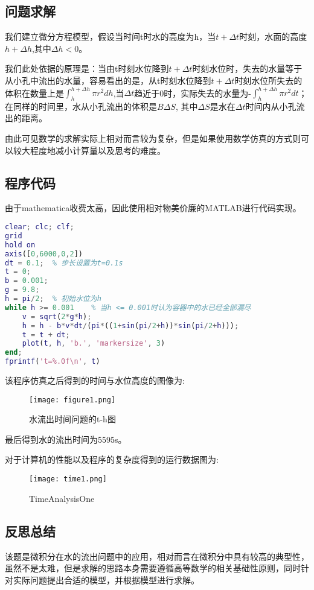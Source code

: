 \documentclass[UTF8]{ctexart}
\begin{document}
    \subsection{问题求解}
    我们建立微分方程模型，假设当时间t时水的高度为h，当$t+\Delta{t}$时刻，水面的高度$h+\Delta{h}$,其中$\Delta{h}<0$。

    我们此处依据的原理是：当由t时刻水位降到$t+\Delta{t}$时刻水位时，失去的水量等于从小孔中流出的水量，容易看出的是，从t时刻水位降到$t+\Delta{t}$时刻水位所失去的体积在数量上是$\int_{h}^{h+\Delta{h}}\pi r^2 dh$,当$\Delta t$趋近于0时，实际失去的水量为-$\int_{h}^{h+\Delta{h}}\pi r^2 dt$；在同样的时间里，水从小孔流出的体积是$B\Delta S$, 其中$\Delta S$是水在$\Delta t$时间内从小孔流出的距离。

    由此可见数学的求解实际上相对而言较为复杂，但是如果使用数学仿真的方式则可以较大程度地减小计算量以及思考的难度。

    \subsection{程序代码}
    由于mathematica收费太高，因此使用相对物美价廉的MATLAB进行代码实现。

\begin{lstlisting}[language=matlab]
clear; clc; clf;
grid
hold on
axis([0,6000,0,2])
dt = 0.1;  % 步长设置为t=0.1s
t = 0;
b = 0.001;
g = 9.8;
h = pi/2;  % 初始水位为h
while h >= 0.001    % 当h <= 0.001时认为容器中的水已经全部漏尽
    v = sqrt(2*g*h);
    h = h - b*v*dt/(pi*((1+sin(pi/2+h))*sin(pi/2+h)));
    t = t + dt;
    plot(t, h, 'b.', 'markersize', 3)
end;
fprintf('t=%.0f\n', t)
\end{lstlisting}

该程序仿真之后得到的时间与水位高度的图像为:

\begin{figure}[!htb]
  \centering
  \texttt{[image: figure1.png]}
  \caption{水流出时间问题的t-h图}\label{水流出时间问题的t-h图}
\end{figure}

最后得到水的流出时间为5595s。

对于计算机的性能以及程序的复杂度得到的运行数据图为:

\begin{figure}[!htb]
  \centering
  \texttt{[image: time1.png]}
  \caption{TimeAnalysisOne}\label{TimeAnalysisOne}
\end{figure}

    \subsection{反思总结}
    该题是微积分在水的流出问题中的应用，相对而言在微积分中具有较高的典型性，虽然不是太难，但是求解的思路本身需要遵循高等数学的相关基础性原则，同时针对实际问题提出合适的模型，并根据模型进行求解。
\end{document}
